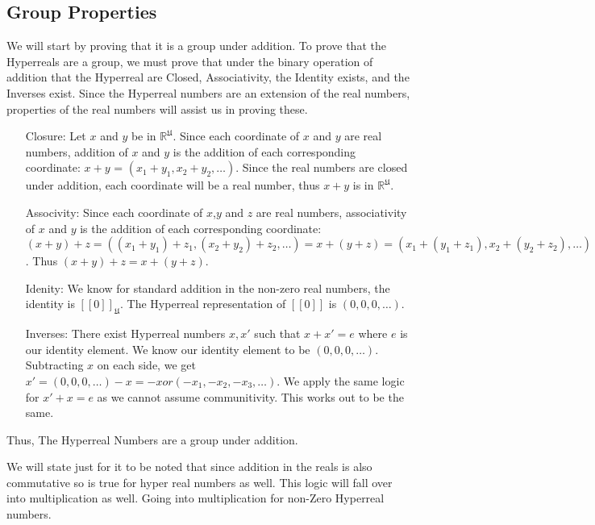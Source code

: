 \documentclass[12pt]{report}
\newcommand{\R}{\mathbb{R}}
\newcommand{\U}{\mathfrak{U}}
\begin{document}
\subsection*{Group Properties}
We will start by proving that it is a group under addition.
To prove that the Hyperreals are a group, we must prove that under the binary operation of addition that the Hyperreal are Closed, Associativity, the Identity exists, and the Inverses exist.
Since the Hyperreal numbers are an extension of the real numbers, properties of the real numbers will assist us in proving these.
\begin{enumerate}
    \item[Closure:]Let $x$ and $y$ be in $\R^\U $.
    Since each coordinate of $x$ and $y$ are real numbers, addition of $x$ and $y $ is the addition of each corresponding coordinate: $x+y$ = $(x_1 + y_1, x_2+y_2,\ldots)$.
    Since the real numbers are closed under addition, each coordinate will be a real number, thus $x+y$ is in $\R^\U$.
    \item[Associvity:]Since each coordinate of $x$,$y$ and $z$ are real numbers, associativity of $x$ and $y $ is the addition of each corresponding coordinate: $(x+y)+z = ((x_1 + y_1)+z_1, (x_2+y_2)+z_2,\ldots) =x+(y+z) = (x_1 + (y_1+z_1), x_2+(y_2+z_2),\ldots)$.
    Thus $(x+y)+z= x+(y+z)$.
    \item[Idenity:]We know for standard addition in the non-zero real numbers, the identity is $[[0]]_{\U}$.
    The Hyperreal representation of $[[0]]$ is $(0, 0, 0,\ldots)$.
    \item[Inverses:]There exist Hyperreal numbers $x, x'$ such that $x+x' = e $ where $e$ is our identity element.
    We know our identity element to be $(0, 0, 0, \ldots)$.
    Subtracting $x$ on each side, we get $x' = (0, 0, 0,\ldots) - x = -x or (-x_1, -x_2, -x_3,\ldots)$. We apply the same logic for $x' +x = e $ as we cannot assume communitivity.
    This works out to be the same.
\end{enumerate}
Thus, The Hyperreal Numbers are a group under addition.
\newline \par We will state just for it to be noted that since addition in the reals is also commutative so is true for hyper real numbers as well.
This logic will fall over into multiplication as well.
Going into multiplication for non-Zero Hyperreal numbers. \newline \par
\end{document}
